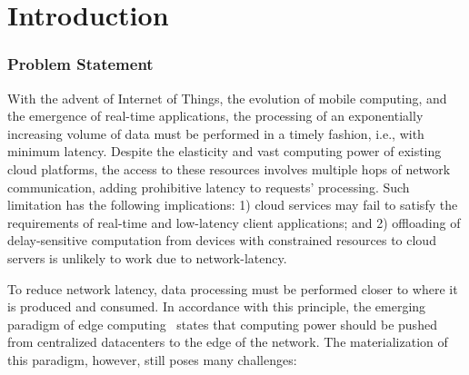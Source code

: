 \section{Introduction}

\subsubsection*{Problem Statement}

With the advent of Internet of Things, the evolution of mobile computing, and the emergence of real-time applications, the processing of an exponentially increasing volume of data must be performed in a timely fashion, i.e., with minimum latency. Despite the elasticity and vast computing power of existing cloud platforms, the access to these resources involves multiple hops of network communication, adding prohibitive latency to requests' processing. Such limitation has the following implications: 1) cloud services may fail to satisfy the requirements of real-time and low-latency client applications; and 2) offloading of delay-sensitive computation from devices with constrained resources to cloud servers is unlikely to work due to network-latency.

%
%
%


To reduce network latency, data processing must be performed closer to where it is produced and consumed. In accordance with this principle, the emerging paradigm of edge computing~\cite{} states that computing power should be pushed from centralized datacenters to the edge of the network. 
The materialization of this paradigm, however, still poses many challenges:

